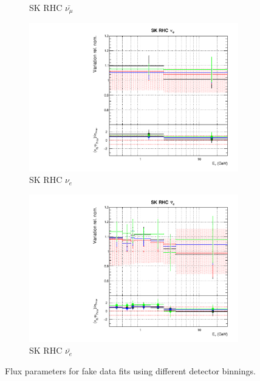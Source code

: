 \begin{figure}[t]
\begin{subfigure}{0.24\textwidth}
  \caption{SK RHC $\bar{\nu_{\mu}}$}
\end{subfigure}
\begin{subfigure}{0.24\textwidth}
  \centering
  \includegraphics[width=0.95\linewidth]{figs/detcovbinflux_14}
  \caption{SK RHC $\nu_e$}
\end{subfigure}
\begin{subfigure}{0.24\textwidth}
  \centering
  \includegraphics[width=0.95\linewidth]{figs/detcovbinflux_15}
  \caption{SK RHC $\bar{\nu_e}$}
\end{subfigure}
\caption{Flux parameters for fake data fits using different detector binnings.}
\label{fig:detcovbinfluxSK}
\end{figure}

